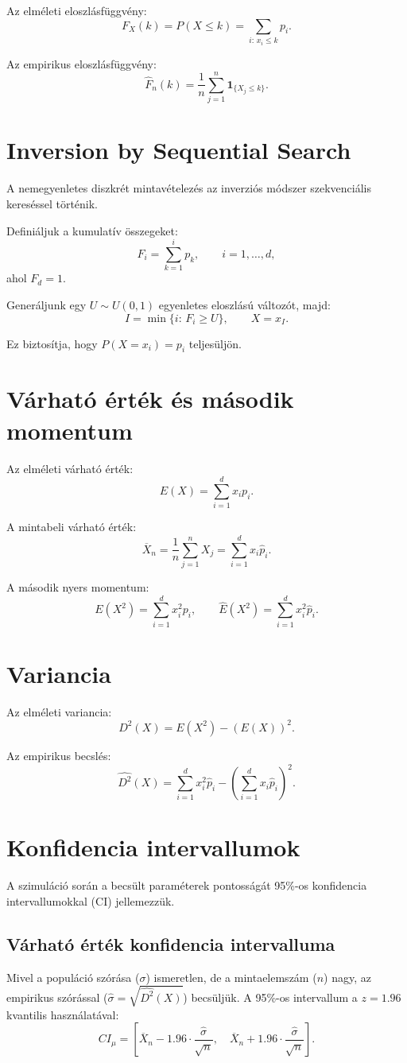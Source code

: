 \documentclass[a4paper,12pt]{article}
\begin{document}
Az elméleti eloszlásfüggvény:
\[
F_X(k) = P(X\le k) = \sum_{i:\,x_i\le k} p_i.
\]

Az empirikus eloszlásfüggvény:
\[
\widehat F_n(k)
=
\frac{1}{n}\sum_{j=1}^{n} \mathbf 1_{\{X_j\le k\}}.
\]

\section{Inversion by Sequential Search}

A nemegyenletes diszkrét mintavételezés az inverziós módszer
szekvenciális kereséssel történik.

Definiáljuk a kumulatív összegeket:
\[
F_i = \sum_{k=1}^{i} p_k,
\qquad i=1,\dots,d,
\]
ahol $F_d=1$.

Generáljunk egy $U\sim U(0,1)$ egyenletes eloszlású változót, majd:
\[
I = \min\{i:\, F_i \ge U\},
\qquad X=x_I.
\]

Ez biztosítja, hogy $P(X=x_i)=p_i$ teljesüljön.

\section{Várható érték és második momentum}

Az elméleti várható érték:
\[
E(X) = \sum_{i=1}^{d} x_i p_i.
\]

A mintabeli várható érték:
\[
\overline X_n = \frac{1}{n}\sum_{j=1}^{n} X_j
= \sum_{i=1}^{d} x_i \hat p_i.
\]

A második nyers momentum:
\[
E(X^2)=\sum_{i=1}^{d} x_i^2 p_i,
\qquad
\widehat E(X^2)=\sum_{i=1}^{d} x_i^2 \hat p_i.
\]

\section{Variancia}

Az elméleti variancia:
\[
D^2(X) = E(X^2) - (E(X))^2.
\]

Az empirikus becslés:
\[
\widehat{D^2}(X)
=
\sum_{i=1}^{d} x_i^2 \hat p_i
-
\left(\sum_{i=1}^{d} x_i \hat p_i\right)^2.
\]

\section{Konfidencia intervallumok}

A szimuláció során a becsült paraméterek pontosságát 95\%-os konfidencia intervallumokkal (CI) jellemezzük.

\subsection{Várható érték konfidencia intervalluma}
Mivel a populáció szórása ($\sigma$) ismeretlen, de a mintaelemszám ($n$) nagy, az empirikus szórással ($\hat{\sigma} = \sqrt{\widehat{D^2}(X)}$) becsüljük. A 95\%-os intervallum a $z=1.96$ kvantilis használatával:
\[
CI_{\mu} = \left[ \overline{X}_n - 1.96 \cdot \frac{\hat{\sigma}}{\sqrt{n}}, \quad \overline{X}_n + 1.96 \cdot \frac{\hat{\sigma}}{\sqrt{n}} \right].
\]
\end{document}
